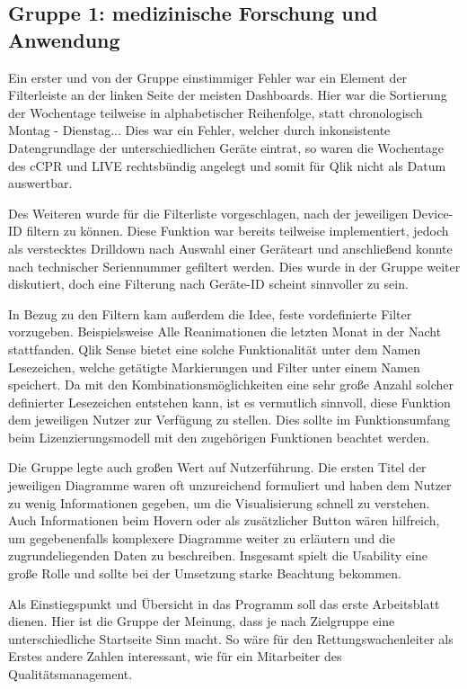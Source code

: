 \subsection{Gruppe 1: medizinische Forschung und Anwendung}
\label{sub:gruppe1}
Ein erster und von der Gruppe einstimmiger Fehler war ein Element der Filterleiste an der linken Seite der meisten Dashboards.
Hier war die Sortierung der Wochentage teilweise in alphabetischer Reihenfolge, statt chronologisch Montag - Dienstag...
Dies war ein Fehler, welcher durch inkonsistente Datengrundlage der unterschiedlichen Geräte eintrat, so waren die Wochentage des \gls{cCPR} und \gls{LIVE} rechtsbündig angelegt und somit für Qlik nicht als Datum auswertbar.

Des Weiteren wurde für die Filterliste vorgeschlagen, nach der jeweiligen \glqq Device-ID\grqq{} filtern zu können.
Diese Funktion war bereits teilweise implementiert, jedoch als verstecktes \gls{Drilldown} nach Auswahl einer Geräteart und anschließend konnte nach technischer Seriennummer gefiltert werden.
Dies wurde in der Gruppe weiter diskutiert, doch eine Filterung nach Geräte-ID scheint sinnvoller zu sein.

In Bezug zu den Filtern kam außerdem die Idee, feste vordefinierte Filter vorzugeben.
Beispielsweise \glqq Alle Reanimationen die letzten Monat in der Nacht stattfanden\grqq{}. 
Qlik Sense bietet eine solche Funktionalität unter dem Namen \glqq Lesezeichen\grqq{}, welche getätigte Markierungen und Filter unter einem Namen speichert.
Da mit den Kombinationsmöglichkeiten eine sehr große Anzahl solcher definierter Lesezeichen entstehen kann, ist es vermutlich sinnvoll, diese Funktion dem jeweiligen Nutzer zur Verfügung zu stellen.
Dies sollte im Funktionsumfang beim Lizenzierungsmodell mit den zugehörigen Funktionen beachtet werden.

Die Gruppe legte auch großen Wert auf Nutzerführung.
Die ersten Titel der jeweiligen Diagramme waren oft unzureichend formuliert und haben dem Nutzer zu wenig Informationen gegeben, um die Visualisierung schnell zu verstehen.
Auch Informationen beim \glqq \gls{Hovern}\grqq{} oder als zusätzlicher \gls{Button} wären hilfreich, um gegebenenfalls komplexere Diagramme weiter zu erläutern und die zugrundeliegenden Daten zu beschreiben. 
Insgesamt spielt die Usability eine große Rolle und sollte bei der Umsetzung starke Beachtung bekommen.

Als Einstiegspunkt und Übersicht in das Programm soll das erste Arbeitsblatt dienen.
Hier ist die Gruppe der Meinung, dass je nach Zielgruppe eine unterschiedliche Startseite Sinn macht.
So wäre für den Rettungswachenleiter als Erstes andere Zahlen interessant, wie für ein Mitarbeiter des Qualitätsmanagement.

